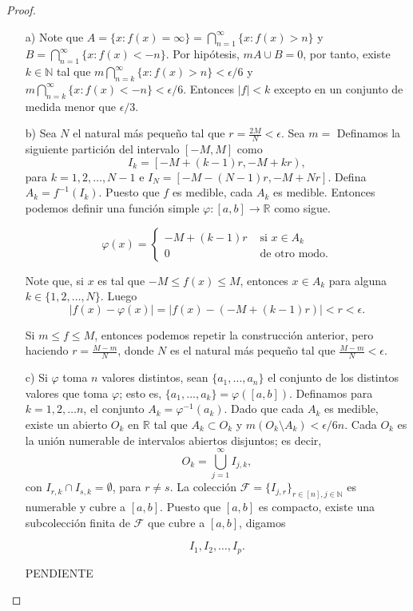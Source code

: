 \documentclass[12pt]{article}
\newcommand{\N}{\mathbb{N}}
\newcommand{\R}{\mathbb{R}}
\begin{document}
\begin{proof}
    \begin{itemize}
        \item[a)] Note que $A = \{x: f(x) = \infty \} = \bigcap_{n=1}^\infty \{x: f(x) > n\}$ y $ B = \bigcap_{n=1}^\infty \{ x: f(x) < -n \}$. Por hipótesis, $m A \cup B = 0$, por tanto, existe $k \in \mathbb N$ tal que $m \bigcap_{n=k}^\infty \{x: f(x) > n\} < \epsilon / 6$ y $m \bigcap_{n=k}^\infty \{ x: f(x) < -n \} < \epsilon / 6$. Entonces $\lvert f \rvert < k$ excepto en un conjunto de medida menor que $\epsilon / 3.$
        \item[b)] Sea $N$ el natural más pequeño tal que $r = \frac{2M}{N} < \epsilon.$ Sea $m = $ Definamos la siguiente partición del intervalo $[-M, M]$ como
        $$I_k = \left [-M + (k-1)r, -M +   k r \right), $$
para $k = 1, 2, \ldots, N-1$ e $I_N = [-M - (N-1) r, -M + Nr]$. Defina $A_k = f^{-1}(I_k)$. Puesto que $f$ es medible, cada $A_k$ es medible. Entonces podemos definir una función simple $\varphi:[a, b] \rightarrow \R $ como sigue.

$$\varphi(x) = \begin{cases}
-M + (k-1) r & \text{ si } x \in A_k \\
0 & \text{ de otro modo.}  
\end{cases} $$

Note que, si $x$ es tal que $-M \leq f(x) \leq M$, entonces $x \in A_k$ para alguna $k \in \{1, 2, \ldots, N\}$. Luego
$$\lvert f(x) - \varphi(x) \rvert = \lvert f(x) - (-M + (k-1)r) \rvert < r < \epsilon.$$

Si $m \leq f \leq M$, entonces podemos repetir la construcción anterior, pero haciendo $r = \frac{M - m}{N}$, donde $N$ es el natural más pequeño tal que $\frac{M - m}{N} < \epsilon.$

\item[c)] Si $\varphi$ toma $n$ valores distintos, sean $\{a_1, \ldots, a_n \}$ el conjunto de los distintos valores que toma $\varphi$; esto es, $\{a_1, \ldots, a_k \} = \varphi([a, b])$. Definamos para $k=1,2, \ldots n$, el conjunto $A_k = \varphi^{-1}(a_k)$. Dado que cada $A_k$ es medible, existe un abierto $O_k$ en $\R$ tal que $A_k \subset O_k$ y $m (O_k \setminus A_k) < \epsilon / 6n$. Cada $O_k$ es la unión numerable de intervalos abiertos disjuntos; es decir, 
$$O_k = \bigcup_{j=1}^\infty I_{j,k},$$
con $I_{r, k} \cap I_{s, k} = \emptyset $, para $r \neq s$. La colección $\mathcal{F} =  \{ I_{j, r} \}_{r \in [n],  j \in \N}$ es numerable y cubre a $[a, b]$. Puesto que $[a, b]$ es compacto, existe una subcolección finita de $\mathcal{F}$ que cubre a $[a, b]$, digamos

$$I_1, I_2, \ldots, I_p. $$

PENDIENTE

    \end{itemize}
\end{proof}
\end{document}
